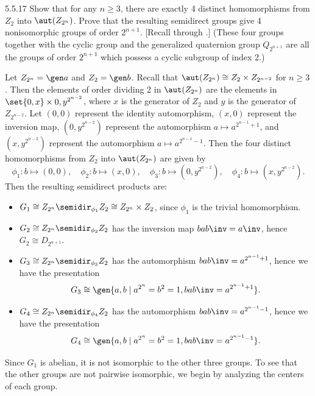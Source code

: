 \begin{exercise}{5.5.17}
    Show that for any $n \geq 3$, there are exactly 4 distinct homomorphisms from $Z_2$ into $\aut(Z_{2^n})$.
	Prove that the resulting semidirect groups give 4 nonisomorphic groups of order $2^{n + 1}$. [Recall  through .] (These four groups together with the cyclic group and the generalized quaternion group $Q_{2^{n + 1}}$ are all the groups of order $2^{n + 1}$ which possess a cyclic subgroup of index 2.)
\end{exercise}

\begin{sol}
    Let $Z_{2^n} = \gen a$ and $Z_2 = \gen b$.
	Recall that $\aut(Z_{2^n}) \cong Z_2 \times Z_{2^{n - 2}}$ for $n \geq 3$.
	Then the elements of order dividing 2 in $\aut(Z_{2^n})$ are the elements in $\set{0, x} \times {0, y^{2^{n - 2}}}$, where $x$ is the generator of $Z_2$ and $y$ is the generator of $Z_{2^{n - 2}}$.
	Let $(0, 0)$ represent the identity automorphism, $(x, 0)$ represent the inversion map, $(0, y^{2^{n - 2}})$ represent the automorphism $a \mapsto a^{2^{n - 1} + 1}$, and $(x, y^{2^{n - 2}})$ represent the automorphism $a \mapsto a^{2^{n - 1} - 1}$.
	Then the four distinct homomorphisms from $Z_2$ into $\aut(Z_{2^n})$ are given by
    \[
    	\phi_1 \colon b \mapsto (0, 0), \quad \phi_2 \colon b \mapsto (x, 0), \quad \phi_3 \colon b \mapsto (0, y^{2^{n - 2}}), \quad \phi_4 \colon b \mapsto (x, y^{2^{n - 2}}).
    \]
    Then the resulting semidirect products are:
    \begin{itemize}
        \item $G_1 \cong Z_{2^n} \semidir_{\phi_1} Z_2 \cong Z_{2^n} \times Z_2$, since $\phi_1$ is the trivial homomorphism.
        \item $G_2 \cong Z_{2^n} \semidir_{\phi_2} Z_2$ has the inversion map $bab\inv = a\inv$, hence $G_2 \cong D_{2^{n + 1}}$.
        \item $G_3 \cong Z_{2^n} \semidir_{\phi_3} Z_2$ has the automorphism $bab\inv = a^{2^{n - 1} + 1}$, hence we have the presentation
        \[
        	G_3 \cong \gen{a, b \mid a^{2^n} = b^2 = 1, bab\inv = a^{2^{n - 1} + 1}}.
        \]
        \item $G_4 \cong Z_{2^n} \semidir_{\phi_4} Z_2$ has the automorphism $bab\inv = a^{2^{n - 1} - 1}$, hence we have the presentation
        \[
        	G_4 \cong \gen{a, b \mid a^{2^n} = b^2 = 1, bab\inv = a^{2^{n - 1} - 1}}.
        \]
    \end{itemize}
    Since $G_1$ is abelian, it is not isomorphic to the other three groups.
	To see that the other groups are not pairwise isomorphic, we begin by analyzing the centers of each group.


\end{sol}
